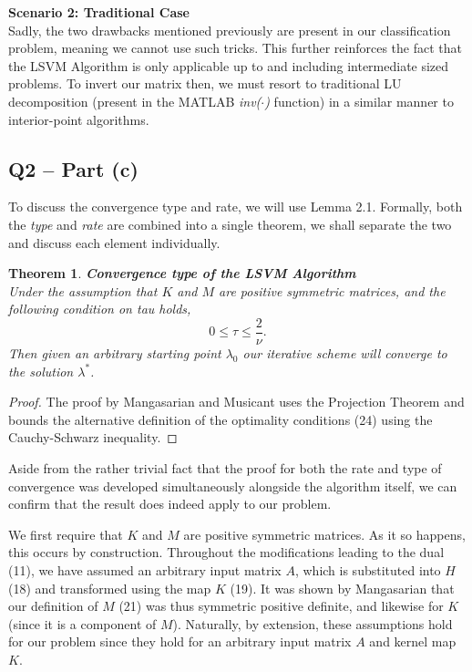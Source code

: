 \documentclass{article}
\newtheorem{theorem}{Theorem}[section]
\begin{document}
\textbf{Scenario 2: Traditional Case} \\
Sadly, the two drawbacks mentioned previously are present in our classification problem, meaning we cannot use such tricks. This further reinforces the fact that the LSVM Algorithm is only applicable up to and including intermediate sized problems. To invert our matrix then, we must resort to traditional LU decomposition (present in the MATLAB \textit{inv($\cdot$)} function) \cite{web:maths:MATLAB} in a similar manner to interior-point algorithms.


\subsection*{Q2 – Part (c)}
To discuss the convergence type and rate, we will use Lemma 2.1. Formally, both the \textit{type} and \textit{rate} are combined into a single theorem, we shall separate the two and discuss each element individually.

\begin{theorem} \textbf{Convergence \textit{type} of the LSVM Algorithm} \cite{mangasarian2001lagrangian} \\
Under the assumption that $K$ and $M$ are positive symmetric matrices, and the following condition on tau holds,
\begin{equation}
    0 \leq \tau \leq \frac{2}{\nu}.
\end{equation}
Then given an arbitrary starting point $\lambda_{0}$ our iterative scheme will converge to the solution $\lambda^{*}$.
\end{theorem}
\begin{proof}
The proof by Mangasarian and Musicant uses the Projection Theorem \cite{bertsekas1997nonlinear} and  bounds the alternative definition of the optimality conditions (24) using the Cauchy-Schwarz inequality.
\end{proof}

Aside from the rather trivial fact that the proof for both the rate and type of convergence was developed simultaneously alongside the algorithm itself, we can confirm that the result does indeed apply to our problem. \par

We first require that $K$ and $M$ are positive symmetric matrices. As it so happens, this occurs by construction. Throughout the modifications leading to the dual (11), we have assumed an arbitrary input matrix $A$, which is substituted into $H$ (18) and transformed using the map $K$ (19). It was shown by Mangasarian \cite{mangasarian1994nonlinear} that our definition of $M$ (21) was thus symmetric positive definite, and likewise for $K$ (since it is a component of $M$). Naturally, by extension, these assumptions hold for our problem since they hold for an arbitrary input matrix $A$ and kernel map $K$. \par
\end{document}
